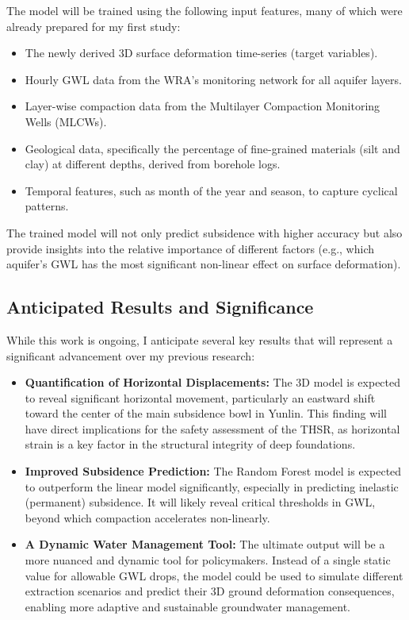 \documentclass[12pt, a4paper]{article}
\begin{document}
	The model will be trained using the following input features, many of which were already prepared for my first study:
	\begin{itemize}
		\item The newly derived 3D surface deformation time-series (target variables).
		\item Hourly GWL data from the WRA's monitoring network for all aquifer layers.
		\item Layer-wise compaction data from the Multilayer Compaction Monitoring Wells (MLCWs).
		\item Geological data, specifically the percentage of fine-grained materials (silt and clay) at different depths, derived from borehole logs.
		\item Temporal features, such as month of the year and season, to capture cyclical patterns.
	\end{itemize}
	The trained model will not only predict subsidence with higher accuracy but also provide insights into the relative importance of different factors (e.g., which aquifer's GWL has the most significant non-linear effect on surface deformation).
	
	\subsection{Anticipated Results and Significance}
	
	While this work is ongoing, I anticipate several key results that will represent a significant advancement over my previous research:
	\begin{itemize}
		\item \textbf{Quantification of Horizontal Displacements:} The 3D model is expected to reveal significant horizontal movement, particularly an eastward shift toward the center of the main subsidence bowl in Yunlin. This finding will have direct implications for the safety assessment of the THSR, as horizontal strain is a key factor in the structural integrity of deep foundations.
		\item \textbf{Improved Subsidence Prediction:} The Random Forest model is expected to outperform the linear model significantly, especially in predicting inelastic (permanent) subsidence. It will likely reveal critical thresholds in GWL, beyond which compaction accelerates non-linearly.
		\item \textbf{A Dynamic Water Management Tool:} The ultimate output will be a more nuanced and dynamic tool for policymakers. Instead of a single static value for allowable GWL drops, the model could be used to simulate different extraction scenarios and predict their 3D ground deformation consequences, enabling more adaptive and sustainable groundwater management.
	\end{itemize}
	
\end{document}
